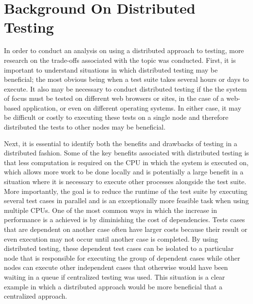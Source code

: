 \documentclass{article}
\begin{document}
{\section{Background On Distributed Testing}

In order to conduct an analysis on using a distributed approach to testing, more research on the trade-offs associated with the topic was conducted. First, it is important to understand situations in which distributed testing may be beneficial; the most obvious being when a test suite takes several hours or days to execute. It also may be necessary to conduct distributed testing if the the system of focus must be tested on different web browsers or sites, in the case of a web-based application, or even on different operating systems. In either case, it may be difficult or costly to executing these tests on a single node and therefore distributed the tests to other nodes may be beneficial. 

Next, it is essential to identify both the benefits and drawbacks of testing in a distributed fashion. Some of the key benefits associated with distributed testing is that less computation is required on the CPU in which the system is executed on, which allows more work to be done locally and is potentially a large benefit in a situation where it is necessary to execute other processes alongside the test suite. More importantly, the goal is to reduce the runtime of the test suite by executing several test cases in parallel and is an exceptionally more feasible task when using multiple CPUs. One of the most common ways in which the increase in performance is a achieved is by diminishing the cost of dependencies. Tests cases that are dependent on another case often have larger costs because their result or even execution may not occur until another case is completed. By using distributed testing, these dependent test cases can be isolated to a particular node that is responsible for executing the group of dependent cases while other nodes can execute other independent cases that otherwise would have been waiting in a queue if centralized testing was used. This situation is a clear example in which a distributed approach would be more beneficial that a centralized approach.

}
\end{document}
